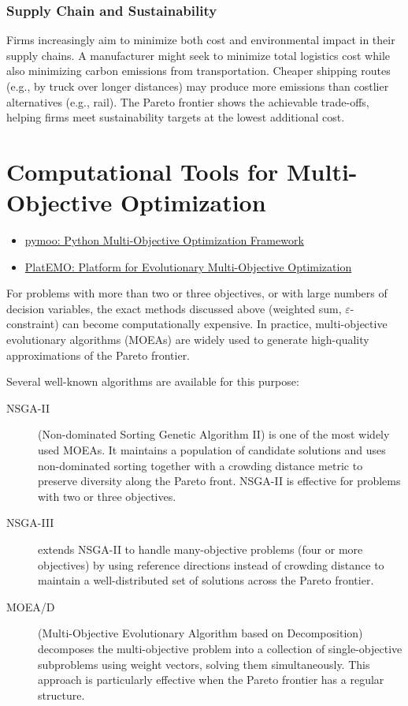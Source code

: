 \subsubsection{Supply Chain and Sustainability}
Firms increasingly aim to minimize both cost and environmental impact in their supply chains.  A manufacturer might seek to minimize total logistics cost while also minimizing carbon emissions from transportation.  Cheaper shipping routes (e.g., by truck over longer distances) may produce more emissions than costlier alternatives (e.g., rail).  The Pareto frontier shows the achievable trade-offs, helping firms meet sustainability targets at the lowest additional cost.

\section{Computational Tools for Multi-Objective Optimization}
\label{sec:moo-tools}

\begin{resource}
\begin{itemize}
\item \href{https://pymoo.org/}{pymoo: Python Multi-Objective Optimization Framework}
\item \href{https://platemo.com/}{PlatEMO: Platform for Evolutionary Multi-Objective Optimization}
\end{itemize}
\end{resource}

For problems with more than two or three objectives, or with large numbers of decision variables, the exact methods discussed above (weighted sum, $\varepsilon$-constraint) can become computationally expensive. In practice, multi-objective evolutionary algorithms (MOEAs) are widely used to generate high-quality approximations of the Pareto frontier.

Several well-known algorithms are available for this purpose:
\begin{description}
\item[NSGA-II] (Non-dominated Sorting Genetic Algorithm II) is one of the most widely used MOEAs. It maintains a population of candidate solutions and uses non-dominated sorting together with a crowding distance metric to preserve diversity along the Pareto front. NSGA-II is effective for problems with two or three objectives.
\item[NSGA-III] extends NSGA-II to handle many-objective problems (four or more objectives) by using reference directions instead of crowding distance to maintain a well-distributed set of solutions across the Pareto frontier.
\item[MOEA/D] (Multi-Objective Evolutionary Algorithm based on Decomposition) decomposes the multi-objective problem into a collection of single-objective subproblems using weight vectors, solving them simultaneously. This approach is particularly effective when the Pareto frontier has a regular structure.
\end{description}

